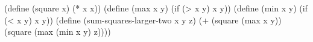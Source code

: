 \begtt{}
(define (square x) (* x x))
(define (max x y) (if (> x y) x y))
(define (min x y) (if (< x y) x y))
(define (sum-squares-larger-two x y z)
   (+ (square (max x y))
      (square (max (min x y) z))))
\endtt

